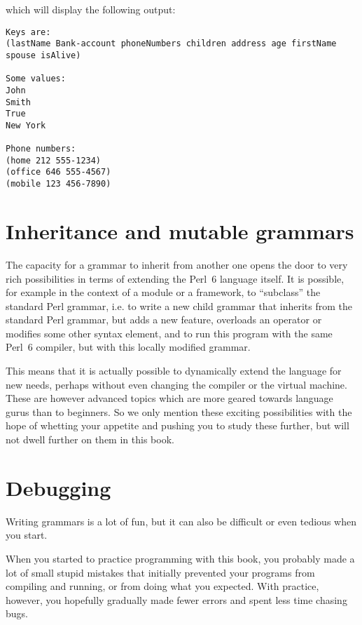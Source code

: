 which will display the following output:

\begin{verbatim}
Keys are:
(lastName Bank-account phoneNumbers children address age firstName spouse isAlive)

Some values:
John
Smith
True
New York

Phone numbers:
(home 212 555-1234)
(office 646 555-4567)
(mobile 123 456-7890)
\end{verbatim}

\section{Inheritance and mutable grammars}

The capacity for a grammar to inherit from another one opens 
the door to very rich possibilities in terms of 
extending the Perl~6 language itself. It is possible, for 
example in the context of a module or a framework, to ``subclass'' 
the standard Perl grammar, i.e. to write a new child grammar that 
inherits from the standard Perl grammar, but adds a new 
feature, overloads an operator or modifies some other syntax 
element, and to run this program with the same Perl~6 compiler,
but with this locally modified grammar.

This means that it is actually possible to dynamically extend 
the language for new needs, perhaps without even changing the compiler 
or the virtual machine. These are however advanced topics which 
are more geared towards language gurus than to beginners. So 
we only mention these exciting possibilities with the hope of 
whetting your appetite and pushing you to study these further, 
but will not dwell further on them in this book.

\section{Debugging}

Writing grammars is a lot of fun, but it can also be difficult 
or even tedious when you start.

When you started to practice programming with this book, you probably 
made a lot of small stupid mistakes that initially prevented your 
programs from compiling and running, or from doing what 
you expected. With practice, however, you hopefully gradually 
made fewer errors and spent less time chasing bugs.

